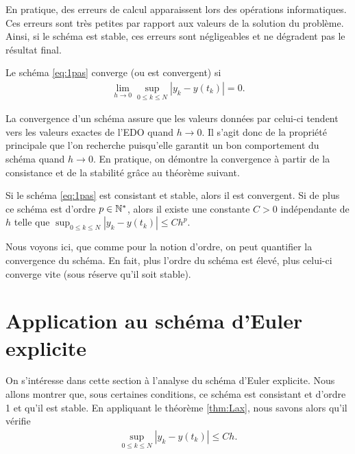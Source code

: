 \documentclass[12pt,a4paper,twoside]{article}
\begin{document}
En pratique, des erreurs de calcul apparaissent lors des op\'erations informatiques.
Ces erreurs sont tr\`es petites par rapport aux valeurs de la solution du probl\`eme.
Ainsi, si le sch\'ema est stable, ces erreurs sont n\'egligeables et ne d\'egradent
pas le r\'esultat final.


\begin{definition}[Convergence]
  Le sch\'ema \eqref{eq:1pas} converge (ou est convergent) si
  \begin{align*}
    \lim_{h \to 0} \sup_{0 \leq k \leq N} | y_k - y(t_k) | = 0 .
  \end{align*}
\end{definition}

La convergence d'un sch\'ema assure que les valeurs donn\'ees par celui-ci
tendent vers les valeurs exactes de l'EDO quand $h \to 0$.
Il s'agit donc de la propri\'et\'e principale que l'on recherche puisqu'elle
garantit un bon comportement du sch\'ema quand $h \to 0$.
En pratique, on d\'emontre la convergence \`a partir de la consistance
et de la stabilit\'e gr\^ace au th\'eor\`eme suivant.

\begin{theorem}
  \label{thm:Lax}
  Si le sch\'ema \eqref{eq:1pas} est consistant et stable, alors il est convergent.
  Si de plus ce sch\'ema est d'ordre $p \in \mathbb{N}^*$, alors il existe une constante $C>0$
  ind\'ependante de $h$ telle que
  $\sup_{0 \leq k \leq N} | y_k - y(t_k) | \leq C h^p$.
\end{theorem}

Nous voyons ici, que comme pour la notion d'ordre, on peut quantifier la convergence du sch\'ema.
En fait, plus l'ordre du sch\'ema est \'elev\'e, plus celui-ci converge vite (sous r\'eserve qu'il soit stable).

\section{Application au sch\'ema d'Euler explicite}

On s'int\'eresse dans cette section \`a l'analyse du sch\'ema d'Euler explicite.
Nous allons montrer que, sous certaines conditions, 
ce sch\'ema est consistant et d'ordre 1 et qu'il est stable.
En appliquant le th\'eor\`eme \ref{thm:Lax}, nous savons alors qu'il v\'erifie
\begin{align*}
  \sup_{0 \leq k \leq N} | y_k - y(t_k) | \leq C h .
\end{align*}
\end{document}
